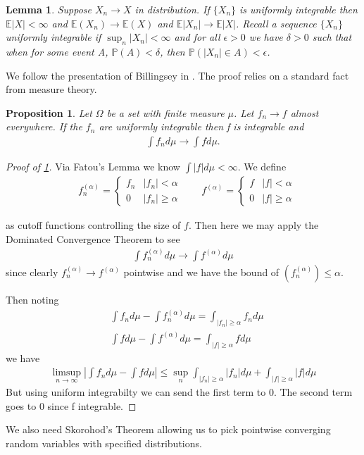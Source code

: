 \documentclass[10pt]{article}
\newcommand{\E}{\mathbb{E}}
\newcommand{\1}{\textbf{1}}
\newcommand{\lparen}{\left(}
\newcommand{\rparen}{\right)}
\newtheorem{prop}[theorem]{Proposition}
\newtheorem{lemma}[theorem]{Lemma}
\theoremstyle{remark}
\theoremstyle{definition}
\begin{document}
\begin{lemma}\label{lem:A1}
	Suppose $X_n \to X$ in distribution. If $\{X_n\}$ is uniformly integrable then $\E|X| < \infty$ and $\E(X_n) \to \E(X)$ and $\E |X_n| \to \E |X|$. Recall a sequence $\{X_n\}$ uniformly integrable if $\sup_n |X_n| < \infty$ and for all $\epsilon > 0$ we have $\delta > 0$ such that when for some event A, $\mathbb{P}(A) < \delta$, then $\mathbb{P}(|X_n| \in A) < \epsilon$. 
\end{lemma} We follow the presentation of Billingsey in \cite{BB}. The proof relies on a standard fact from measure theory.

\begin{prop}\label{prop:A1}
	Let $\Omega$ be a set with finite measure $\mu$. Let $f_n \to f$ almost everywhere. If the $f_n$ are uniformly integrable then f is integrable and
	\begin{align*}
		\int f_n d\mu \to \int f d\mu.
	\end{align*}
\end{prop}

\begin{proof}[Proof of \ref{prop:A1}]
	Via Fatou's Lemma we know $\int |f| d\mu < \infty$. We define
	\begin{align*}
		&f_n^{{(\alpha)}} = 
		\begin{cases}
			f_n & |f_n| < \alpha \\
			0 & |f_n| \geq \alpha 
		\end{cases}\qquad
		f^{(\alpha)} = 
		\begin{cases}
			f & |f| < \alpha\\
			0 & |f| \geq \alpha
		\end{cases}
	\end{align*}

	as cutoff functions controlling the size of $f$. Then here we may apply the Dominated Convergence Theorem to see
	\begin{align*}
		\int f_n^{(\alpha)} d\mu \to \int f^{(\alpha)} d\mu
	\end{align*}
	since clearly $f_n^{(\alpha)} \to f^{(\alpha)}$ pointwise and we have the bound of $\lparen f_n^{(\alpha)}\rparen \leq \alpha$. 

	Then noting
	\begin{align*}
		&\int f_n d\mu - \int f_n^{(\alpha)} d\mu = \int_{|f_n| \geq \alpha} f_n d\mu \\
		& \int f d\mu - \int f^{(\alpha)} d\mu = \int_{|f| \geq \alpha} fd\mu
	\end{align*} 
	we have
	\begin{align*}
		\limsup_{n \to \infty}|\int f_n d\mu - \int f d\mu| \leq \sup_n \int_{|f_n|\geq \alpha} |f_n| d\mu + \int_{|f| \geq \alpha} |f| d\mu
	\end{align*}
	But using uniform integrabilty we can send the first term to 0. The second term goes to 0 since f integrable. 
\end{proof} We also need Skorohod's Theorem allowing us to pick pointwise converging random variables with specified distributions.
\end{document}
